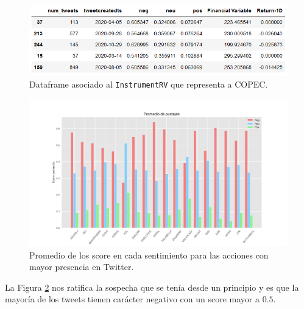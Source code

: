\documentclass{article}
\begin{document}
\begin{figure}[H]
	\centering
	\includegraphics[scale=.65]{imgs/instrument_sentiment_sample.png}
	\caption{Dataframe asociado al \texttt{InstrumentRV} que representa a COPEC.}
	\label{fig:instrument_sentiment_sample}
\end{figure}


\begin{figure}[H]
	\centering
	\includegraphics[scale=.45]{imgs/mean_score_bar.png}
	\caption{Promedio de los score en cada sentimiento para las acciones con mayor presencia en Twitter.}
	\label{fig:mean_score_bar}
\end{figure}

La Figura \ref{fig:mean_score_bar} nos ratifica la sospecha que se tenía desde un principio y es que la mayoría de los tweets tienen carácter negativo con un score mayor a $0.5$.



\newpage

%
\end{document}
